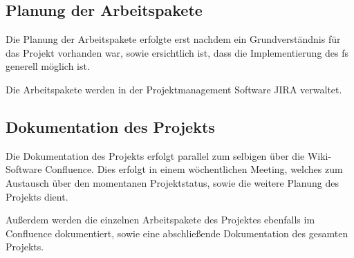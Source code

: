 \subsection{Planung der Arbeitspakete}
Die Planung der Arbeitspakete erfolgte erst nachdem ein Grundverständnis für das Projekt vorhanden war,
sowie ersichtlich ist, dass die Implementierung des \acl{fs} generell möglich ist.

Die Arbeitspakete werden in der Projektmanagement Software JIRA verwaltet.


\subsection{Dokumentation des Projekts}
Die Dokumentation des Projekts erfolgt parallel zum selbigen über die Wiki-Software Confluence.
Dies erfolgt in einem wöchentlichen Meeting, welches zum Austausch über den momentanen Projektstatus,
sowie die weitere Planung des Projekts dient.

Außerdem werden die einzelnen Arbeitspakete des Projektes ebenfalls im Confluence dokumentiert,
sowie eine abschließende Dokumentation des gesamten Projekts.

